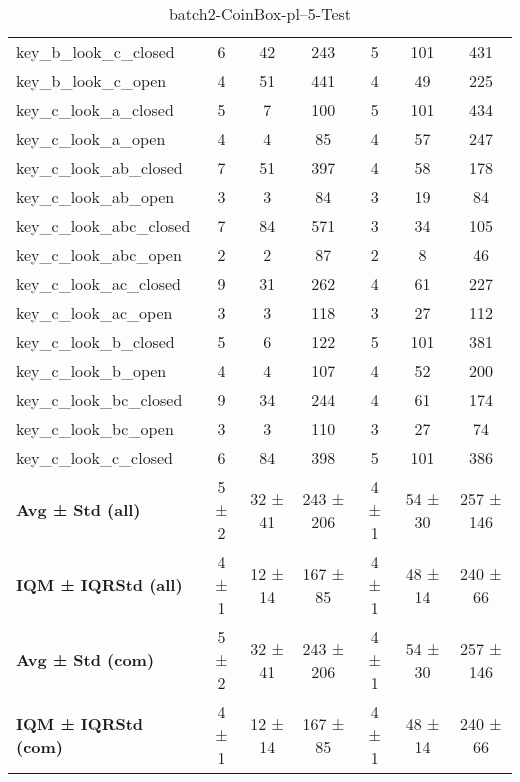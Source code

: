 \begin{table}[!ht]
\begin{tabular}{l|ccc|ccc}
key\_b\_look\_c\_closed & 6 & 42 & 243 & 5 & 101 & 431 \\
key\_b\_look\_c\_open & 4 & 51 & 441 & 4 & 49 & 225 \\
key\_c\_look\_a\_closed & 5 & 7 & 100 & 5 & 101 & 434 \\
key\_c\_look\_a\_open & 4 & 4 & 85 & 4 & 57 & 247 \\
key\_c\_look\_ab\_closed & 7 & 51 & 397 & 4 & 58 & 178 \\
key\_c\_look\_ab\_open & 3 & 3 & 84 & 3 & 19 & 84 \\
key\_c\_look\_abc\_closed & 7 & 84 & 571 & 3 & 34 & 105 \\
key\_c\_look\_abc\_open & 2 & 2 & 87 & 2 & 8 & 46 \\
key\_c\_look\_ac\_closed & 9 & 31 & 262 & 4 & 61 & 227 \\
key\_c\_look\_ac\_open & 3 & 3 & 118 & 3 & 27 & 112 \\
key\_c\_look\_b\_closed & 5 & 6 & 122 & 5 & 101 & 381 \\
key\_c\_look\_b\_open & 4 & 4 & 107 & 4 & 52 & 200 \\
key\_c\_look\_bc\_closed & 9 & 34 & 244 & 4 & 61 & 174 \\
key\_c\_look\_bc\_open & 3 & 3 & 110 & 3 & 27 & 74 \\
key\_c\_look\_c\_closed & 6 & 84 & 398 & 5 & 101 & 386 \\
\hline
\textbf{Avg ± Std (all)} & 5 ± 2 & 32 ± 41 & 243 ± 206 & 4 ± 1 & 54 ± 30 & 257 ± 146 \\
\textbf{IQM ± IQRStd (all)} & 4 ± 1 & 12 ± 14 & 167 ± 85 & 4 ± 1 & 48 ± 14 & 240 ± 66 \\
\textbf{Avg ± Std (com)} & 5 ± 2 & 32 ± 41 & 243 ± 206 & 4 ± 1 & 54 ± 30 & 257 ± 146 \\
\textbf{IQM ± IQRStd (com)} & 4 ± 1 & 12 ± 14 & 167 ± 85 & 4 ± 1 & 48 ± 14 & 240 ± 66 \\
\end{tabular}
\caption{batch2-CoinBox-pl--5-Test}
\label{tab:batch2_CoinBox_pl__5_comparison_test}
\end{table}
